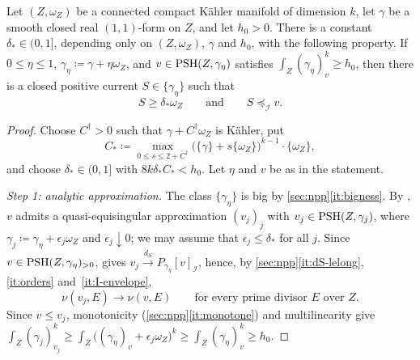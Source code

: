 \documentclass[11pt,a4paper]{amsart}
\newcommand{\dS}{d_{S}}                          %
\newcommand{\lessI}{\preceq_{\mathcal I}}
\theoremstyle{definition}
\begin{document}
\begin{lemma}\label{lem:domination}
Let $(Z,\omega_Z)$ be a connected compact K\"ahler manifold of
dimension $k$, let $\gamma$ be a smooth closed real $(1,1)$-form on $Z$,
and let $h_0>0$. There is a constant $\delta_*\in(0,1]$, depending only on
$(Z,\omega_Z)$, $\gamma$ and $h_0$, with the following property. If
$0\le\eta\le1$, $\gamma_\eta\coloneqq\gamma+\eta\omega_Z$, and
$v\in\mathrm{PSH}(Z,\gamma_\eta)$ satisfies $\int_Z(\gamma_\eta)_v^k\ge h_0$, then
there is a closed positive current $S\in\{\gamma_\eta\}$ such that
\[
  S\ge\delta_*\omega_Z
  \qquad\text{and}\qquad S\lessI v.
\]
\end{lemma}

\begin{proof}
Choose $C^\dagger>0$ such that $\gamma+C^\dagger\omega_Z$ is K\"ahler, put
\[
  C_*\coloneqq\max_{0\le s\le 2+C^\dagger}
  \bigl(\{\gamma\}+s\{\omega_Z\}\bigr)^{k-1}\cdot\{\omega_Z\},
\]
and choose $\delta_*\in(0,1]$ with $8k\delta_*C_*<h_0$. Let $\eta$ and $v$ be as
in the statement.

\emph{Step 1: analytic approximation.} The class $\{\gamma_\eta\}$ is big
by \cref{sec:npp}\ref{it:bigness}. By \cite[Theorem~1.6.2]{XiaSGPT},
$v$ admits a quasi-equisingular approximation $(v_j)_{j}$ with
$v_j\in\mathrm{PSH}(Z,\gamma_j)$, where $\gamma_j\coloneqq\gamma_\eta+\epsilon_j\omega_Z$
and $\epsilon_j\downarrow0$; we may assume that $\epsilon_j\le\delta_*$ for all $j$.
Since $v\in\mathrm{PSH}(Z,\gamma_\eta)_{>0}$, \cite[Corollary~7.1.2]{XiaSGPT}
gives $v_j\xrightarrow{\dS}P_{\gamma_\eta}[v]_\mathcal I$, hence, by
\cref{sec:npp}\ref{it:dS-lelong}, \ref{it:orders} and~\ref{it:I-envelope},
\begin{equation}\label{eq:dom-lelong-conv}
  \nu(v_j,E)\to\nu(v,E)
  \qquad\text{for every prime divisor $E$ over $Z$}.
\end{equation}
Since $v\le v_j$, monotonicity (\cref{sec:npp}\ref{it:monotone}) and
multilinearity give
$\int_Z(\gamma_j)_{v_j}^k\ge\int_Z\bigl((\gamma_\eta)_v+\epsilon_j\omega_Z\bigr)^k
\ge\int_Z(\gamma_\eta)_v^k\ge h_0$.


\end{proof}
\end{document}
